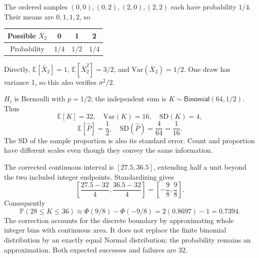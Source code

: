 \documentclass[11pt]{article}
\begin{document}
\begin{parts}
\item The ordered samples $(0,0),(0,2),(2,0),(2,2)$ each have probability $1/4$. Their means are $0,1,1,2$, so
\begin{center}\begin{tabular}{c|ccc}\toprule
Possible $\bar X_2$ & 0 & 1 & 2\\\midrule
Probability & $1/4$ & $1/2$ & $1/4$\\\bottomrule
\end{tabular}\end{center}
Directly, $\mathbb E[\bar X_2]=1$, $\mathbb E[\bar X_2^2]=3/2$, and $\mathrm{Var}(\bar X_2)=1/2$. One draw has variance 1, so this also verifies $\sigma^2/2$.
\item $H_i$ is Bernoulli with $p=1/2$; the independent sum is $K\sim\mathsf{Binomial}(64,1/2)$. Thus
\[
\mathbb E[K]=32,\quad \mathrm{Var}(K)=16,\quad \mathrm{SD}(K)=4,
\]
\[
\mathbb E[\widehat P]=\frac12,\quad \mathrm{SD}(\widehat P)=\frac4{64}=\frac1{16}.
\]
The SD of the sample proportion is also its standard error. Count and proportion have different scales even though they convey the same information.
\item The corrected continuous interval is $[27.5,36.5]$, extending half a unit beyond the two included integer endpoints. Standardizing gives
\[
\left[\frac{27.5-32}{4},\frac{36.5-32}{4}\right]
=\left[-\frac98,\frac98\right].
\]
Consequently
\[
\mathbb P(28\leq K\leq36)\approx\Phi(9/8)-\Phi(-9/8)
=2(0.8697)-1=0.7394.
\]
The correction accounts for the discrete boundary by approximating whole integer bins with continuous area. It does not replace the finite binomial distribution by an exactly equal Normal distribution; the probability remains an approximation. Both expected successes and failures are 32.
\end{parts}
\end{document}
